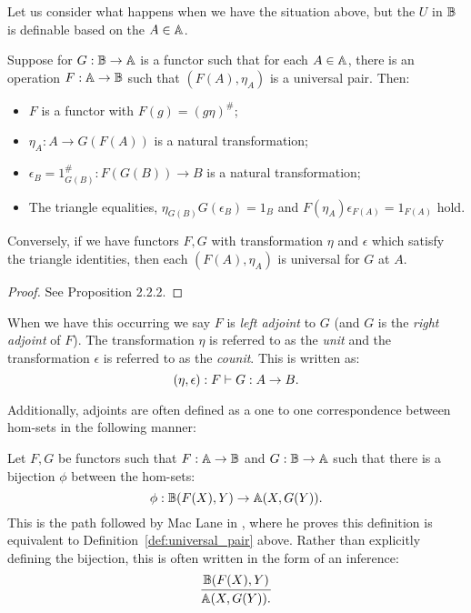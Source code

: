 Let us consider what happens when we have the situation above, but the $U$ in $\mathbb{B}$ is definable
based on the $A\in\mathbb{A}$.
\begin{lemma}\label{lem:adjoint-setup}
  Suppose for $G:\mathbb{B}\to\mathbb{A}$ is a functor such that for each $A\in\mathbb{A}$, there is an operation
  $F:\mathbb{A}\to\mathbb{B}$ such that  $(F(A),\eta_A)$ is a universal pair. Then:
  \begin{itemize}
    \item $F$ is a functor with $F(g) = (g\eta)^{\#}$;
    \item $\eta_A: A \to G(F(A))$ is a natural transformation;
    \item $\epsilon_B = 1_{G(B)}^{\#}:F(G(B)) \to B$ is a natural transformation;
    \item The triangle equalities, $\eta_{G(B)}G(\epsilon_B) = 1_B$ and $F(\eta_A)\epsilon_{F(A)} =
      1_{F(A)}$ hold.
  \end{itemize}
  Conversely, if we have functors $F,G$ with transformation $\eta$ and $\epsilon$ which satisfy the
  triangle identities, then each $(F(A),\eta_A)$ is universal for $G$ at $A$.
\end{lemma}
\begin{proof}
  See Proposition 2.2.2\cite{cockett2009:ctcs}.
\end{proof}

When we have this occurring we say $F$ is \emph{left adjoint} to $G$ (and $G$ is the
\emph{right adjoint} of $F$). The transformation $\eta$ is referred to as the \emph{unit} and the
transformation $\epsilon$ is referred to as the \emph{counit}. This is written as:
\[
  (\eta,\epsilon):F\vdash G:A\to B.
\]

Additionally, adjoints are often defined as a one to one correspondence between hom-sets in the
following manner:

Let $F,G$ be functors such that $F:\mathbb{A} \to \mathbb{B}$ and $G:\mathbb{B} \to \mathbb{A}$ such that there is a bijection $\phi$
between the hom-sets:
\[
  \phi: \mathbb{B}(F(X),Y) \to \mathbb{A}(X,G(Y)).
\]
This is the path followed by Mac Lane in \cite{maclan97:categorieswrkmath}, where he proves this
definition is equivalent to Definition~\ref{def:universal_pair} above. Rather than explicitly
defining the bijection, this is often written in the form of an inference:
\[
  \infer{\A(X,G(Y)).}{\B(F(X),Y)}
\]



